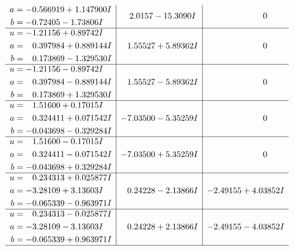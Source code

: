 \documentclass[1p]{elsarticle_modified}
\theoremstyle{definition}
\begin{document}
$$\begin{array}{c|c|c}
\begin{aligned}
a &= -0.566919 + 1.147900 I \\
b &= -0.72405 - 1.73806 I\end{aligned}
 & \phantom{-}2.0157 - 15.3090 I & \phantom{-0.000000 } 0 \\ \hline\begin{aligned}
u &= -1.21156 + 0.89742 I \\
a &= \phantom{-}0.397984 + 0.889144 I \\
b &= \phantom{-}0.173869 - 1.329530 I\end{aligned}
 & \phantom{-}1.55527 + 5.89362 I & \phantom{-0.000000 } 0 \\ \hline\begin{aligned}
u &= -1.21156 - 0.89742 I \\
a &= \phantom{-}0.397984 - 0.889144 I \\
b &= \phantom{-}0.173869 + 1.329530 I\end{aligned}
 & \phantom{-}1.55527 - 5.89362 I & \phantom{-0.000000 } 0 \\ \hline\begin{aligned}
u &= \phantom{-}1.51600 + 0.17015 I \\
a &= \phantom{-}0.324411 + 0.071542 I \\
b &= -0.043698 - 0.329284 I\end{aligned}
 & -7.03500 - 5.35259 I & \phantom{-0.000000 } 0 \\ \hline\begin{aligned}
u &= \phantom{-}1.51600 - 0.17015 I \\
a &= \phantom{-}0.324411 - 0.071542 I \\
b &= -0.043698 + 0.329284 I\end{aligned}
 & -7.03500 + 5.35259 I & \phantom{-0.000000 } 0 \\ \hline\begin{aligned}
u &= \phantom{-}0.234313 + 0.025877 I \\
a &= -3.28109 + 3.13603 I \\
b &= -0.065339 - 0.963971 I\end{aligned}
 & \phantom{-}0.24228 - 2.13866 I & -2.49155 + 4.03852 I \\ \hline\begin{aligned}
u &= \phantom{-}0.234313 - 0.025877 I \\
a &= -3.28109 - 3.13603 I \\
b &= -0.065339 + 0.963971 I\end{aligned}
 & \phantom{-}0.24228 + 2.13866 I & -2.49155 - 4.03852 I\\
 \hline 
 \end{array}$$\newpage\newpage\renewcommand{\arraystretch}{1}
\end{document}
